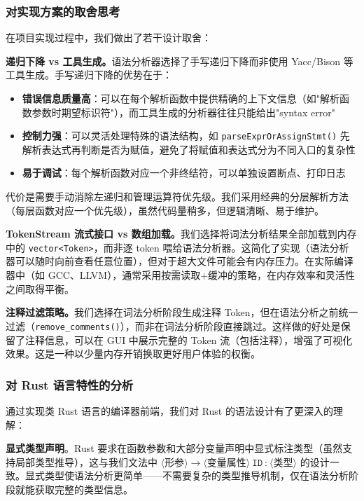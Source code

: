 \documentclass[12pt,a4paper]{ctexart}
\begin{document}
\subsubsection{对实现方案的取舍思考}

在项目实现过程中，我们做出了若干设计取舍：

\textbf{递归下降 vs 工具生成。}语法分析器选择了手写递归下降而非使用 Yacc/Bison 等工具生成。手写递归下降的优势在于：
\begin{itemize}
    \item \textbf{错误信息质量高}：可以在每个解析函数中提供精确的上下文信息（如"解析函数参数时期望标识符"），而工具生成的分析器往往只能给出"syntax error"
    \item \textbf{控制力强}：可以灵活处理特殊的语法结构，如 \texttt{parseExprOrAssignStmt()} 先解析表达式再判断是否为赋值，避免了将赋值和表达式分为不同入口的复杂性
    \item \textbf{易于调试}：每个解析函数对应一个非终结符，可以单独设置断点、打印日志
\end{itemize}

代价是需要手动消除左递归和管理运算符优先级。我们采用经典的分层解析方法（每层函数对应一个优先级），虽然代码量稍多，但逻辑清晰、易于维护。

\textbf{TokenStream 流式接口 vs 数组加载。}我们选择将词法分析结果全部加载到内存中的 \texttt{vector<Token>}，而非逐 token 喂给语法分析器。这简化了实现（语法分析器可以随时向前查看任意位置），但对于超大文件可能会有内存压力。在实际编译器中（如 GCC、LLVM），通常采用按需读取+缓冲的策略，在内存效率和灵活性之间取得平衡。

\textbf{注释过滤策略。}我们选择在词法分析阶段生成注释 Token，但在语法分析之前统一过滤（\texttt{remove\_comments()}），而非在词法分析阶段直接跳过。这样做的好处是保留了注释信息，可以在 GUI 中展示完整的 Token 流（包括注释），增强了可视化效果。这是一种以少量内存开销换取更好用户体验的权衡。

\subsubsection{对 Rust 语言特性的分析}

通过实现类 Rust 语言的编译器前端，我们对 Rust 的语法设计有了更深入的理解：

\textbf{显式类型声明}。Rust 要求在函数参数和大部分变量声明中显式标注类型（虽然支持局部类型推导），这与我们文法中 $\langle\text{形参}\rangle \rightarrow \langle\text{变量属性}\rangle \ \texttt{ID} \ \texttt{:} \ \langle\text{类型}\rangle$ 的设计一致。显式类型使语法分析更简单——不需要复杂的类型推导机制，仅在语法分析阶段就能获取完整的类型信息。
\end{document}
